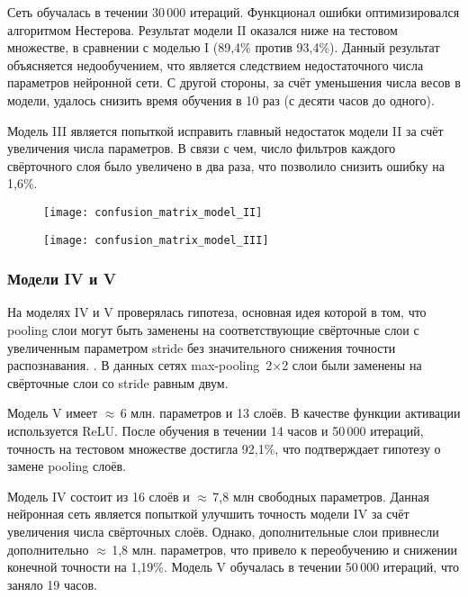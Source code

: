 Сеть обучалась в течении 30\,000 итераций. Функционал ошибки оптимизировался алгоритмом Нестерова.
Результат модели II оказался ниже на тестовом множестве, в сравнении с моделью I (89,4\% против 93,4\%).
Данный результат объясняется недообучением, что является следствием недостаточного числа параметров нейронной сети.
С другой стороны, за счёт уменьшения числа весов в модели, удалось снизить время обучения в 10 раз (с десяти часов до одного).

Модель III является попыткой исправить главный недостаток модели II за счёт увеличения числа параметров.
В связи с чем, число фильтров каждого свёрточного слоя было увеличено в два раза, что позволило снизить ошибку на 1,6\%.

\begin{figure}[H]
\centering
\begin{minipage}{.5\textwidth}
  \centering
  \texttt{[image: confusion\_matrix\_model\_II]}
  \vspace*{-1.7cm}
\end{minipage}%
\begin{minipage}{.5\textwidth}
  \centering
  \texttt{[image: confusion\_matrix\_model\_III]}
  \vspace*{-1.7cm}
\end{minipage}
\end{figure}

\subsubsection{Модели IV и V}
На моделях IV и V проверялась гипотеза, основная идея которой в том, что pooling слои могут быть заменены
на соответствующие свёрточные слои с увеличенным параметром stride без значительного снижения точности распознавания.
\cite{DBLP:journals/corr/SpringenbergDBR14}. В данных сетях max-pooling~2$\times$2 слои были заменены 
на свёрточные слои со stride равным двум.

Модель V имеет $\approx$\,6 млн. параметров и 13 слоёв. В качестве функции активации используется ReLU.
После обучения в течении 14 часов и 50\,000 итераций, точность на тестовом множестве достигла 92,1\%, что
подтверждает гипотезу о замене pooling слоёв.

Модель IV состоит из 16 слоёв и $\approx$\,7,8 млн свободных параметров. Данная нейронная сеть является попыткой
улучшить точность модели IV за счёт увеличения числа свёрточных слоёв. Однако, дополнительные слои привнесли
дополнительно $\approx$\,1,8 млн. параметров, что привело к переобучению и снижении конечной точности на 1,19\%.
Модель V обучалась в течении 50\,000 итераций, что заняло 19 часов.

